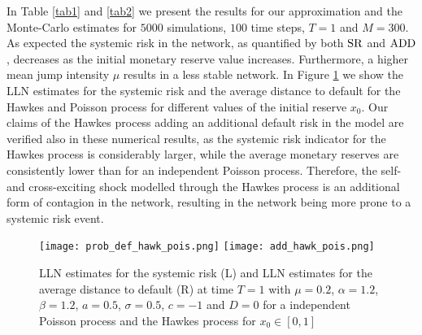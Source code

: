 \documentclass[10pt]{article}
\theoremstyle{plain}
\theoremstyle{definition}
\newcommand{\<}{\langle}
\renewcommand{\>}{\rangle}
\renewcommand{\(}{\left(}
\renewcommand{\)}{\right)}
\renewcommand{\[}{\left[}
\renewcommand{\]}{\right]}
\begin{document}
In Table \ref{tab1} and \ref{tab2} we present the results for our approximation and the
Monte-Carlo estimates for $5000$ simulations, $100$ time steps, $T=1$ and $M=300$. As expected the
systemic risk in the network, as quantified by both $\text{\rm SR}$ and $\text{\rm ADD}$,
decreases as the initial monetary reserve value increases. Furthermore, a higher mean jump intensity
$\mu$ results in a less stable network. In Figure \ref{fig11} we show the LLN estimates for the
systemic risk and the average distance to default for the Hawkes and Poisson process for different values of the initial reserve $x_0$. Our claims
of the Hawkes process adding an additional default risk in the model are verified also in these
numerical results, as the systemic risk indicator for the Hawkes process is considerably larger,
while the average monetary reserves are consistently lower than for an independent Poisson
process. Therefore, the self- and cross-exciting shock modelled through the Hawkes process is an
additional form of contagion in the network, resulting in the network being more prone to a
systemic risk event.

\begin{figure}[H]
\begin{center}
   \caption{LLN estimates for the systemic risk (L) and LLN estimates for the average distance to default (R) at time $T=1$ with $\mu=0.2$, $\alpha = 1.2$, $\beta=1.2$, $a=0.5$, $\sigma=0.5$, $c=-1$ and $D=0$ for a independent Poisson process and the Hawkes process for $x_0\in [0,1]$}
\texttt{[image: prob\_def\_hawk\_pois.png]}
\texttt{[image: add\_hawk\_pois.png]}
\end{center}
\label{fig11}
\end{figure}
\end{document}
